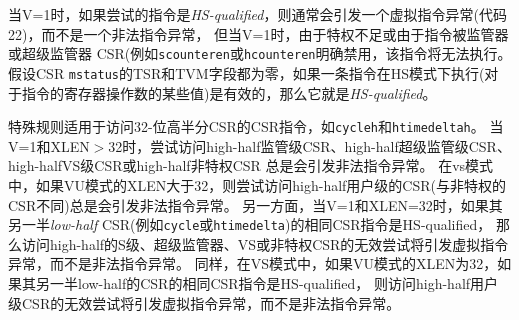 当V=1时，如果尝试的指令是\textit{HS-qualified}，则通常会引发一个虚拟指令异常(代码22)，而不是一个非法指令异常，
但当V=1时，由于特权不足或由于指令被监管器或超级监管器 CSR(例如{\tt scounteren}或{\tt hcounteren}明确禁用，该指令将无法执行。
假设CSR {\tt mstatus}的TSR和TVM字段都为零，如果一条指令在HS模式下执行(对于指令的寄存器操作数的某些值)是有效的，那么它就是\textit{HS-qualified}。

特殊规则适用于访问\mbox{32-位}高半分CSR的CSR指令，如{\tt cycleh}和{\tt htimedeltah}。
当V=1和XLEN$>$32时，尝试访问high-half监管级CSR、high-half超级监管级CSR、high-halfVS级CSR或high-half非特权CSR
总是会引发非法指令异常。
在vs模式中，如果VU模式的XLEN大于32，则尝试访问high-half用户级的CSR(与非特权的CSR不同)总是会引发非法指令异常。
另一方面，当V=1和XLEN=32时，如果其另一半\textit{low-half} CSR(例如\@ {\tt cycle}或{\tt htimedelta})的相同CSR指令是HS-qualified，
那么访问high-half的S级、超级监管器、VS或非特权CSR的无效尝试将引发虚拟指令异常，而不是非法指令异常。
同样，在VS模式中，如果VU模式的XLEN为32，如果其另一半low-half的CSR的相同CSR指令是HS-qualified，
则访问high-half用户级CSR的无效尝试将引发虚拟指令异常，而不是非法指令异常。

